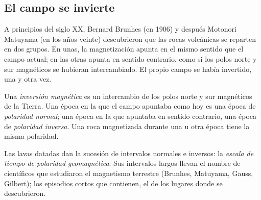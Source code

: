 \subsection{El campo se invierte}

A principios del siglo XX, Bernard Brunhes (en 1906) y después Motonori
Matuyama (en los años veinte) descubrieron que las rocas volcánicas se
reparten en dos grupos. En unas, la magnetización apunta en el mismo sentido
que el campo actual; en las otras apunta en sentido contrario, como si los
polos norte y sur magnéticos se hubieran intercambiado. El propio campo se
había invertido, una y otra vez.

\begin{definition}\label{def:g11:drift-to-spreading:reversal}
Una \emph{inversión magnética}
es un intercambio de los polos norte y sur magnéticos de la Tierra. Una época
en la que el campo apuntaba como hoy es una época de \emph{polaridad
normal}; una época en la que apuntaba en sentido
contrario, una época de \emph{polaridad
inversa}. Una roca magnetizada durante una u otra
época tiene la misma polaridad.
\end{definition}

Las lavas datadas dan la sucesión de intervalos normales e inversos: la
\emph{escala de tiempo de polaridad geomagnética}. Sus intervalos largos
llevan el nombre de científicos que estudiaron el magnetismo terrestre
(Brunhes, Matuyama, Gauss, Gilbert); los episodios cortos que contienen, el
de los lugares donde se descubrieron.

